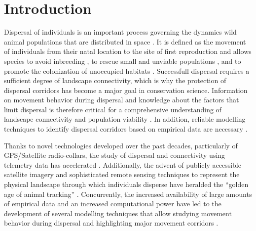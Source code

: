 \documentclass[abstract=on,10pt,a4paper,bibliography=totocnumbered]{article}
\begin{document}
\newpage

\onehalfspacing
\tableofcontents
\doublespacing

\newpage
{}


\section{Introduction}
Dispersal of individuals is an important process governing the dynamics wild
animal populations that are distributed in space \citep{Clobert.2012}. It is
defined as the movement of individuals from their natal location to the site of
first reproduction \cite{Howard.1960} and allows species to avoid inbreeding
\citep{Perrin.1999, Perrin.2000, Frankham.2002, Leigh.2012}, to rescue small and
unviable populations \citep{Brown.1977}, and to promote the colonization of
unoccupied habitats \citep{Hanski.1998, MacArthur.2001}. Successfull dispersal
requires a sufficient degree of landscape connectivity, which is why the
protection of dispersal corridors has become a major goal in conservation
science. Information on movement behavior during dispersal and knowledge about
the factors that limit dispersal is therefore critical for a comprehensive
understanding of landscape connectivity and population viability
\citep{Baguette.2013, Vasudev.2015}. In addition, reliable modelling techniques
to identify dispersal corridors based on empirical data are necessary
\citep{Diniz.2019}.

Thanks to novel technologies developed over the past decades, particularly of
GPS/Satellite radio-collars, the study of dispersal and connectivity using
telemetry data has accelerated \citep{Jonsson.2016, Williams.2019}.
Additionally, the advent of publicly accessible satellite imagery and
sophisticated remote sensing techniques to represent the physical landscape
through which individuals disperse have heralded the ``golden age of animal
tracking'' \citep{Kays.2015}. Concurrently, the increased availability of large
amounts of empirical data and an increased computational power have led to the
development of several modelling techniques that allow studying movement
behavior during dispersal and highlighting major movement corridors
\citep{Boyce.2002, Fortin.2005, Cushman.2010, Zeller.2012, Diniz.2019}.
\end{document}

